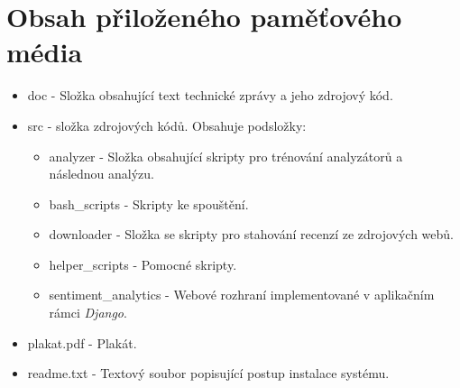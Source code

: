\chapter{Obsah přiloženého paměťového média}

\begin{itemize}
    \item doc - Složka obsahující text technické zprávy a jeho zdrojový kód.
    \item src - složka zdrojových kódů. Obsahuje podsložky:
        \begin{itemize}
            \item analyzer - Složka obsahující skripty pro trénování analyzátorů a následnou analýzu.
            \item bash\_scripts - Skripty ke spouštění.
            \item downloader - Složka se skripty pro stahování recenzí ze zdrojových webů.
            \item helper\_scripts - Pomocné skripty.
            \item sentiment\_analytics - Webové rozhraní implementované v aplikačním rámci \emph{Django}.
        \end{itemize}
    \item plakat.pdf - Plakát.
    \item readme.txt - Textový soubor popisující postup instalace systému.
\end{itemize}                   